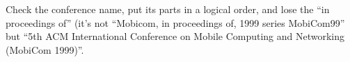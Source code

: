 



Check the conference name, put its parts in a logical order, and lose the ``in proceedings of'' (it's not ``Mobicom, in proceedings of, 1999 series MobiCom99'' but ``5th ACM International Conference on Mobile Computing and Networking (MobiCom 1999)''.